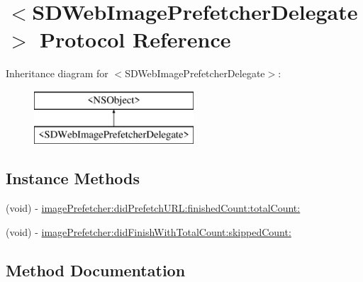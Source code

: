 \hypertarget{protocol_s_d_web_image_prefetcher_delegate-p}{}\section{$<$S\+D\+Web\+Image\+Prefetcher\+Delegate$>$ Protocol Reference}
\label{protocol_s_d_web_image_prefetcher_delegate-p}
Inheritance diagram for $<$S\+D\+Web\+Image\+Prefetcher\+Delegate$>$\+:\begin{figure}[H]
\begin{center}
\leavevmode
\includegraphics[height=2.000000cm]{protocol_s_d_web_image_prefetcher_delegate-p}
\end{center}
\end{figure}
\subsection*{Instance Methods}
\begin{DoxyCompactItemize}
\item 
(void) -\/ \hyperlink{protocol_s_d_web_image_prefetcher_delegate-p_a39f2c901a34761cb31b1e2b7e2c639a4}{image\+Prefetcher\+:did\+Prefetch\+U\+R\+L\+:finished\+Count\+:total\+Count\+:}
\item 
(void) -\/ \hyperlink{protocol_s_d_web_image_prefetcher_delegate-p_af7e00bd1ca1102c8b2e4065e529c45f2}{image\+Prefetcher\+:did\+Finish\+With\+Total\+Count\+:skipped\+Count\+:}
\end{DoxyCompactItemize}


\subsection{Method Documentation}
\hypertarget{protocol_s_d_web_image_prefetcher_delegate-p_af7e00bd1ca1102c8b2e4065e529c45f2}{}
